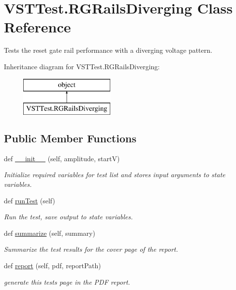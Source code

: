 \hypertarget{class_v_s_t_test_1_1_r_g_rails_diverging}{}\section{V\+S\+T\+Test.\+R\+G\+Rails\+Diverging Class Reference}
\label{class_v_s_t_test_1_1_r_g_rails_diverging}


Tests the reset gate rail performance with a diverging voltage pattern.  


Inheritance diagram for V\+S\+T\+Test.\+R\+G\+Rails\+Diverging\+:\begin{figure}[H]
\begin{center}
\leavevmode
\includegraphics[height=2.000000cm]{class_v_s_t_test_1_1_r_g_rails_diverging}
\end{center}
\end{figure}
\subsection*{Public Member Functions}
\begin{DoxyCompactItemize}
\item 
def \hyperlink{class_v_s_t_test_1_1_r_g_rails_diverging_a3e9f3ea44f1cebae255b767668a63033}{\+\_\+\+\_\+init\+\_\+\+\_\+} (self, amplitude, startV)
\begin{DoxyCompactList}\small\item\em Initialize required variables for test list and stores input arguments to state variables. \end{DoxyCompactList}\item 
def \hyperlink{class_v_s_t_test_1_1_r_g_rails_diverging_a9a27de681058f113edc6acabf0034e28}{run\+Test} (self)
\begin{DoxyCompactList}\small\item\em Run the test, save output to state variables. \end{DoxyCompactList}\item 
def \hyperlink{class_v_s_t_test_1_1_r_g_rails_diverging_a5a6964f3dfda21365e3c581e85b5a31e}{summarize} (self, summary)
\begin{DoxyCompactList}\small\item\em Summarize the test results for the cover page of the report. \end{DoxyCompactList}\item 
def \hyperlink{class_v_s_t_test_1_1_r_g_rails_diverging_ab88a31c9d04ed4f1cdb17bd17544df40}{report} (self, pdf, report\+Path)
\begin{DoxyCompactList}\small\item\em generate this test\textquotesingle{}s page in the P\+DF report. \end{DoxyCompactList}\end{DoxyCompactItemize}


